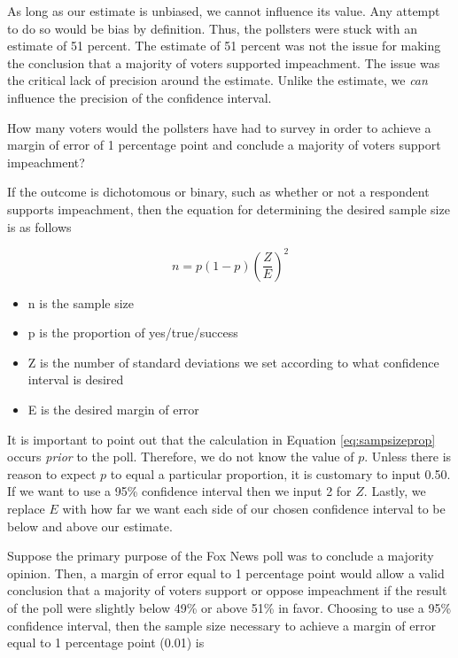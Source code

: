 \documentclass[
]{book}
\providecommand{\tightlist}{%
  \setlength{\itemsep}{0pt}\setlength{\parskip}{0pt}}
\begin{document}
As long as our estimate is unbiased, we cannot influence its value. Any attempt to do so would be bias by definition. Thus, the pollsters were stuck with an estimate of 51 percent. The estimate of 51 percent was not the issue for making the conclusion that a majority of voters supported impeachment. The issue was the critical lack of precision around the estimate. Unlike the estimate, we \emph{can} influence the precision of the confidence interval.

How many voters would the pollsters have had to survey in order to achieve a margin of error of 1 percentage point and conclude a majority of voters support impeachment?

If the outcome is dichotomous or binary, such as whether or not a respondent supports impeachment, then the equation for determining the desired sample size is as follows

\begin{equation}
n=p(1-p)({\frac{Z}{E}})^2
\label{eq:sampsizeprop}
\end{equation}

\begin{itemize}
\tightlist
\item
  n is the sample size
\item
  p is the proportion of yes/true/success
\item
  Z is the number of standard deviations we set according to what confidence interval is desired
\item
  E is the desired margin of error
\end{itemize}

It is important to point out that the calculation in Equation \eqref{eq:sampsizeprop} occurs \emph{prior} to the poll. Therefore, we do not know the value of \(p\). Unless there is reason to expect \(p\) to equal a particular proportion, it is customary to input 0.50. If we want to use a 95\% confidence interval then we input 2 for \(Z\). Lastly, we replace \(E\) with how far we want each side of our chosen confidence interval to be below and above our estimate.

Suppose the primary purpose of the Fox News poll was to conclude a majority opinion. Then, a margin of error equal to 1 percentage point would allow a valid conclusion that a majority of voters support or oppose impeachment if the result of the poll were slightly below 49\% or above 51\% in favor. Choosing to use a 95\% confidence interval, then the sample size necessary to achieve a margin of error equal to 1 percentage point (0.01) is
\end{document}
